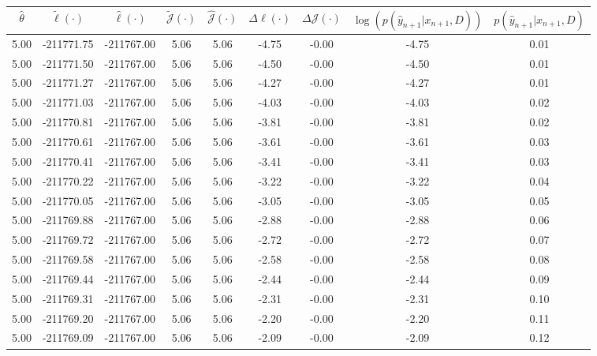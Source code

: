 \begin{table}[htbp]
        \centering
        \tiny
        \begin{adjustbox}{angle=90}
            \begin{tabular}{|c|c|c|c|c|c|c|c|c|}
                \hline
                 $\hat{\theta}$ & $\tilde{\ell}(\cdot)$ & $\hat{\ell}(\cdot)$ & $\tilde{\mathcal{J}}(\cdot)$ & $\hat{\mathcal{J}}(\cdot)$ & $\Delta \ell(\cdot)$ & $\Delta \mathcal{J}(\cdot)$ & $\log(p(\hat{y}_{n+1}|x_{n+1}, D))$ & $p(\hat{y}_{n+1}|x_{n+1}, D)$ \\
                \hline
                 5.00 & -211771.75 & -211767.00 & 5.06 & 5.06 & -4.75 & -0.00 & -4.75 & 0.01\\ \hline
 5.00 & -211771.50 & -211767.00 & 5.06 & 5.06 & -4.50 & -0.00 & -4.50 & 0.01\\ \hline
 5.00 & -211771.27 & -211767.00 & 5.06 & 5.06 & -4.27 & -0.00 & -4.27 & 0.01\\ \hline
 5.00 & -211771.03 & -211767.00 & 5.06 & 5.06 & -4.03 & -0.00 & -4.03 & 0.02\\ \hline
 5.00 & -211770.81 & -211767.00 & 5.06 & 5.06 & -3.81 & -0.00 & -3.81 & 0.02\\ \hline
 5.00 & -211770.61 & -211767.00 & 5.06 & 5.06 & -3.61 & -0.00 & -3.61 & 0.03\\ \hline
 5.00 & -211770.41 & -211767.00 & 5.06 & 5.06 & -3.41 & -0.00 & -3.41 & 0.03\\ \hline
 5.00 & -211770.22 & -211767.00 & 5.06 & 5.06 & -3.22 & -0.00 & -3.22 & 0.04\\ \hline
 5.00 & -211770.05 & -211767.00 & 5.06 & 5.06 & -3.05 & -0.00 & -3.05 & 0.05\\ \hline
 5.00 & -211769.88 & -211767.00 & 5.06 & 5.06 & -2.88 & -0.00 & -2.88 & 0.06\\ \hline
 5.00 & -211769.72 & -211767.00 & 5.06 & 5.06 & -2.72 & -0.00 & -2.72 & 0.07\\ \hline
 5.00 & -211769.58 & -211767.00 & 5.06 & 5.06 & -2.58 & -0.00 & -2.58 & 0.08\\ \hline
 5.00 & -211769.44 & -211767.00 & 5.06 & 5.06 & -2.44 & -0.00 & -2.44 & 0.09\\ \hline
 5.00 & -211769.31 & -211767.00 & 5.06 & 5.06 & -2.31 & -0.00 & -2.31 & 0.10\\ \hline
 5.00 & -211769.20 & -211767.00 & 5.06 & 5.06 & -2.20 & -0.00 & -2.20 & 0.11\\ \hline
 5.00 & -211769.09 & -211767.00 & 5.06 & 5.06 & -2.09 & -0.00 & -2.09 & 0.12\\ \hline

\end{tabular}
\end{adjustbox}
\end{table}
